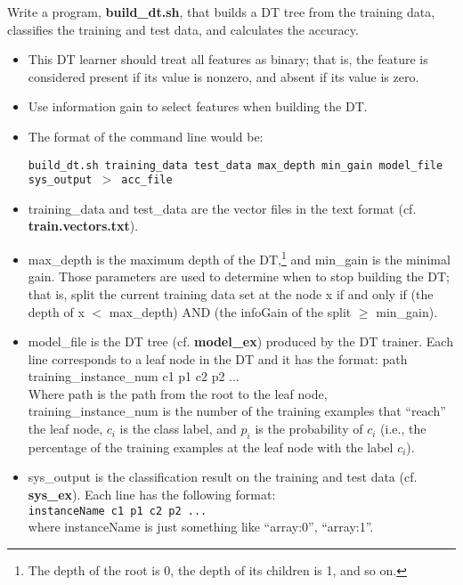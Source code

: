 \documentclass[11pt]{article}
\begin{document}
\vspace{0.7 in}

 Write a program, {\bf build\_dt.sh}, 
that builds a DT tree from
the training data, classifies the training and test data, and calculates
the accuracy.
\begin{itemize} 
   \item This DT learner should treat all features as binary; that is,
        the feature is considered present if its value is nonzero, and
        absent if its value is zero.

   \item Use information gain to select features when building the DT.

  \item The format of the command line would be:

	  {\tt build\_dt.sh training\_data test\_data max\_depth min\_gain model\_file sys\_output $>$ acc\_file }

  \item training\_data and test\_data are the vector files in the text format
        (cf. {\bf train.vectors.txt}).

  \item max\_depth is the maximum depth of the DT,\footnote{The depth of 
        the root is 0, the depth of its children is 1, and so on.}
        and min\_gain is the minimal gain. Those parameters are used
        to determine when to stop building the DT; that is, 
        split the current training data set at the node x
        if and only if (the depth of x $<$ max\_depth)
        AND (the infoGain of the split $\ge$ min\_gain).

      \item model\_file is the DT tree (cf. {\bf model\_ex}) produced by
        the DT trainer.
        Each line corresponds to a leaf node in the DT and it has the format: 
        path training\_instance\_num c1 p1 c2 p2 ...\\
        Where path is the path from the root to the leaf node, 
        training\_instance\_num is the number of the training examples
        that ``reach'' the leaf node, $c_i$ is the class label, and
        $p_i$ is the probability of $c_i$ (i.e., the percentage of 
        the training examples at the leaf node with the label $c_i$).

  \item sys\_output is the classification result on the training and
        test data (cf. {\bf sys\_ex}).
        Each line has the following format: \\
	{\tt instanceName c1 p1 c2 p2 ...} \\
        where instanceName is just something
        like ``array:0'', ``array:1''.
        

\end{itemize}
\end{document}
